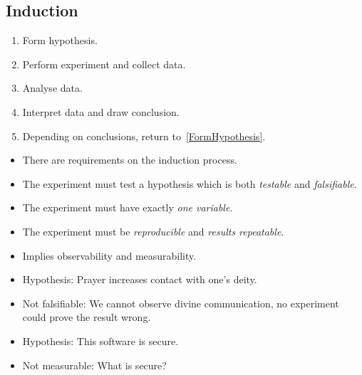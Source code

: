 \subsection{Induction}

\begin{frame}
  \begin{definition}
    \begin{enumerate}
      \item\label{FormHypothesis} Form hypothesis.
      \item Perform experiment and collect data.
      \item Analyse data.
      \item Interpret data and draw conclusion.
      \item Depending on conclusions, return to~\ref{FormHypothesis}.
    \end{enumerate}
  \end{definition}
\end{frame}

\begin{frame}
  \begin{remark}
    \begin{itemize}
      \item There are requirements on the induction process.
      \item The experiment must test a hypothesis which is both \emph{testable} 
        and \emph{falsifiable}.
      \item The experiment must have exactly \emph{one variable}.
      \item The experiment must be \emph{reproducible} and \emph{results 
          repeatable}.
    \end{itemize}
  \end{remark}
\end{frame}

\begin{frame}
  \begin{example}
    \begin{itemize}
      \item Implies observability and measurability.
      \item Hypothesis: Prayer increases contact with one's deity.
      \item Not falsifiable: We cannot observe divine communication, no 
        experiment could prove the result wrong.
    \end{itemize}
  \end{example}

  \pause

  \begin{example}
    \begin{itemize}
      \item Hypothesis: This software is secure.
      \item Not measurable: What is secure?
    \end{itemize}
  \end{example}
\end{frame}

